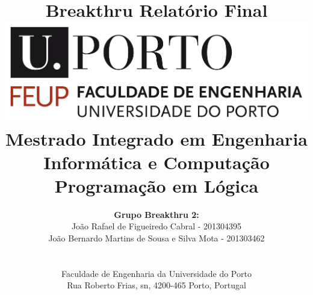 \documentclass[a4paper]{article}
\begin{document}
\setlength{\textwidth}{16cm}
\setlength{\textheight}{22cm}

\title{\Huge\textbf{Breakthru}\linebreak\linebreak\linebreak
\Large\textbf{Relatório Final}\linebreak\linebreak
\linebreak\linebreak
\includegraphics[scale=0.1]{feup-logo.png}\linebreak\linebreak
\linebreak\linebreak
\Large{Mestrado Integrado em Engenharia Informática e Computação} \linebreak\linebreak
\Large{Programação em Lógica}\linebreak
}

\author{\textbf{Grupo Breakthru 2:}\\
João Rafael de Figueiredo Cabral - 201304395 \\
João Bernardo Martins de Sousa e Silva Mota - 201303462 \\
\linebreak\linebreak \\
 \\ Faculdade de Engenharia da Universidade do Porto \\ Rua Roberto Frias, s\/n, 4200-465 Porto, Portugal \linebreak\linebreak\linebreak
\linebreak\linebreak\vspace{1cm}}

\maketitle
\thispagestyle{empty}
\end{document}
